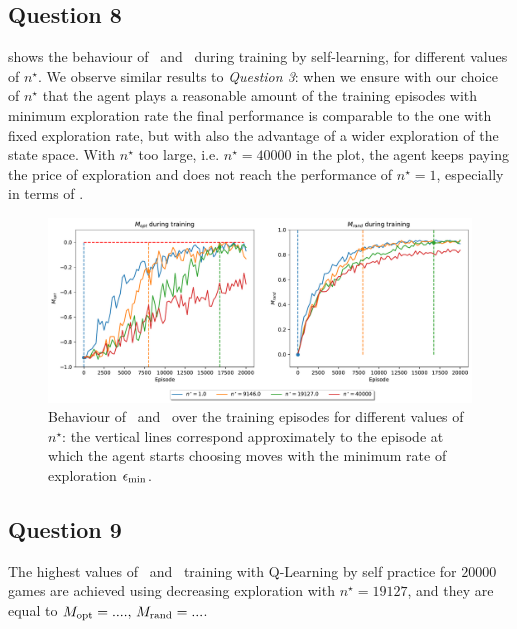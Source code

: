 \documentclass[10pt]{IEEEtran}
\begin{document}
\subsection*{Question 8}
 shows the behaviour of \mopt\ and \mrand\ during training by self-learning, for different values of $n^{\star}$. We observe similar results to \emph{Question 3}: when we ensure with our choice of $n^{\star}$ that the agent plays a reasonable amount of the training episodes with minimum exploration rate the final performance is comparable to the one with fixed exploration rate, but with also the advantage of a wider exploration of the state space. With $n^{\star}$ too large, i.e. $n^{\star} = 40000$ in the plot, the agent keeps paying the price of exploration and does not reach the performance of $n^{\star} = 1$, especially in terms of \mopt.

\begin{figure}[h]
    \centering
    \includegraphics[width=\linewidth]{code/figures/performance_n_star_self.pdf}
    \caption{Behaviour of \mopt\ and \mrand\ over the training episodes for different values of $n^{\star}$:  the vertical lines correspond approximately to the episode at which the agent starts choosing moves with the minimum rate of exploration $\epsilon_{\text{min}}$.}
    \label{plot_question8}
\end{figure}



\subsection*{Question 9}
The highest values of \mopt\  and \mrand\  training with Q-Learning by self practice for $20000$ games are achieved using decreasing exploration with $n^{\star} = 19127$, and they are equal to \textcolor{red}{$M_{\text{opt}} = ...., \, M_{\text{rand}} = ...$}.
\end{document}
